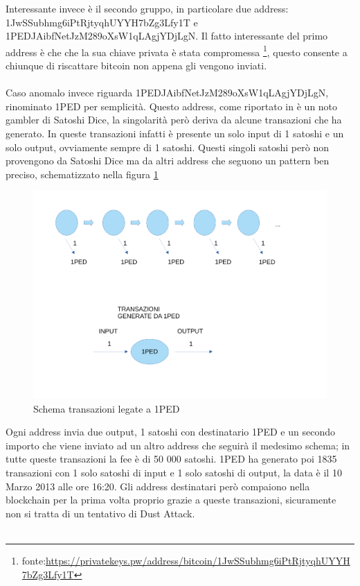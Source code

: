 Interessante invece è il secondo gruppo, in particolare due address: 1JwSSubhmg6iPtRjtyqhUYYH7bZg3Lfy1T e 1PEDJAibfNetJzM289oXsW1qLAgjYDjLgN. Il fatto interessante del primo address è che che la sua chiave privata è stata compromessa \footnote{fonte:\url{https://privatekeys.pw/address/bitcoin/1JwSSubhmg6iPtRjtyqhUYYH7bZg3Lfy1T}}, questo consente a chiunque di riscattare bitcoin non appena gli vengono inviati.\\\\
Caso anomalo invece riguarda 1PEDJAibfNetJzM289oXsW1qLAgjYDjLgN, rinominato 1PED per semplicità. Questo address, come riportato in \cite{dustAnalisi} è un noto gambler di Satoshi Dice, la singolarità però deriva da alcune transazioni che ha generato. In queste transazioni infatti è presente un solo input di 1 satoshi e un solo output, ovviamente sempre di 1 satoshi. Questi singoli satoshi però non provengono da Satoshi Dice ma da altri address che seguono un pattern ben preciso, schematizzato nella figura \ref{fig:1PED}
\begin{figure}[h!]
    \centering
    \includegraphics[scale=0.4]{Images/1Ped.pdf}
    \caption{Schema transazioni legate a 1PED}
    \label{fig:1PED}
\end{figure}
\FloatBarrier
Ogni address invia due output, 1 satoshi con destinatario 1PED e un secondo importo che viene inviato ad un altro address che seguirà il medesimo schema; in tutte queste transazioni la fee è di 50 000 satoshi. 1PED ha generato poi 1835 transazioni con 1 solo satoshi di input e 1 solo satoshi di output, la data è il 10 Marzo 2013 alle ore 16:20. Gli address destinatari però compaiono nella blockchain per la prima volta proprio grazie a queste transazioni, sicuramente non si tratta di un tentativo di Dust Attack.\\\\
